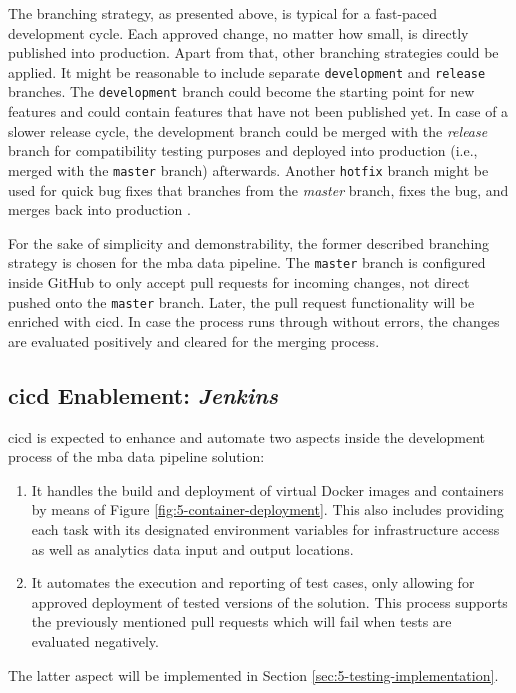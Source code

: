 The branching strategy, as presented above, is typical for a fast-paced development cycle. Each approved change, no matter how small, is directly published into production. Apart from that, other branching strategies could be applied. It might be reasonable to include separate \texttt{development} and \texttt{release} branches. The \texttt{development} branch could become the starting point for new features and could contain features that have not been published yet. In case of a slower release cycle, the development branch could be merged with the \textit{release} branch for compatibility testing purposes and deployed into production (i.e., merged with the \texttt{master} branch) afterwards. Another \texttt{hotfix} branch might be used for quick bug fixes that branches from the \textit{master} branch, fixes the bug, and merges back into production \cite{Driessen2010}.

For the sake of simplicity and demonstrability, the former described branching strategy is chosen for the \ac{mba} data pipeline. The \texttt{master} branch is configured inside GitHub to only accept pull requests for incoming changes, not direct pushed onto the \texttt{master} branch. Later, the pull request functionality will be enriched with \ac{cicd}. In case the process runs through without errors, the changes are evaluated positively and cleared for the merging process.

\subsection{\acs{cicd} Enablement: \textit{Jenkins}}
\ac{cicd} is expected to enhance and automate two aspects inside the development process of the \ac{mba} data pipeline solution:
\begin{enumerate}
	\item It handles the build and deployment of virtual Docker images and containers by means of Figure \ref{fig:5-container-deployment}. This also includes providing each task with its designated environment variables for infrastructure access as well as analytics data input and output locations.
	\item It automates the execution and reporting of test cases, only allowing for approved deployment of tested versions of the solution. This process supports the previously mentioned pull requests which will fail when tests are evaluated negatively.
\end{enumerate}

The latter aspect will be implemented in Section \ref{sec:5-testing-implementation}.

